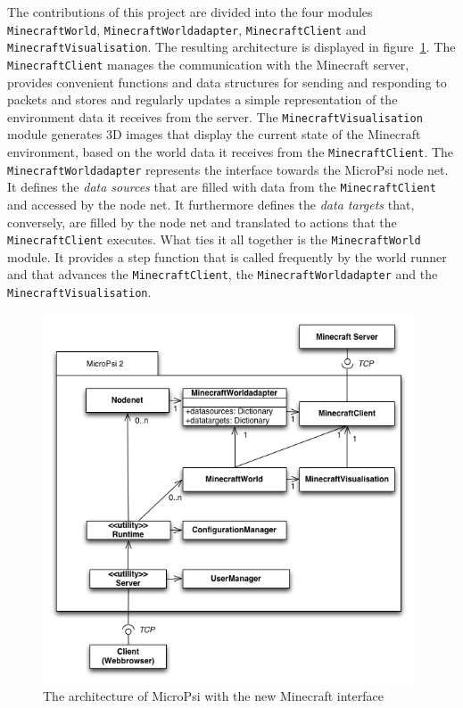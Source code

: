 
The contributions of this project are divided into the four modules \texttt{MinecraftWorld}, \texttt{MinecraftWorldadapter}, \texttt{MinecraftClient} and \texttt{MinecraftVisualisation}. The resulting architecture is displayed in figure~\ref{uml_mc}. The \texttt{MinecraftClient} manages the communication with the Minecraft server, provides convenient functions and data structures for sending and responding to packets and stores and regularly updates a simple representation of the environment data it receives from the server. The \texttt{MinecraftVisualisation} module generates 3D images that display the current state of the Minecraft environment, based on the world data it receives from the \texttt{MinecraftClient}. The \texttt{MinecraftWorldadapter} represents the interface towards the MicroPsi node net. It defines the \emph{data sources} that are filled with data from the \texttt{MinecraftClient} and accessed by the node net. It furthermore defines the \emph{data targets} that, conversely, are filled by the node net and translated to actions that the \texttt{MinecraftClient} executes. What ties it all together is the \texttt{MinecraftWorld} module. It provides a step function that is called frequently by the world runner and that advances the \texttt{MinecraftClient}, the \texttt{MinecraftWorldadapter} and the \texttt{MinecraftVisualisation}.


\begin{figure}[h]
  \centering
    \includegraphics[width=11cm]{graphics/UML_MicroPsi_mit_spock_v14}
  \caption{The architecture of MicroPsi with the new Minecraft interface}
  \label{uml_mc}
\end{figure}

